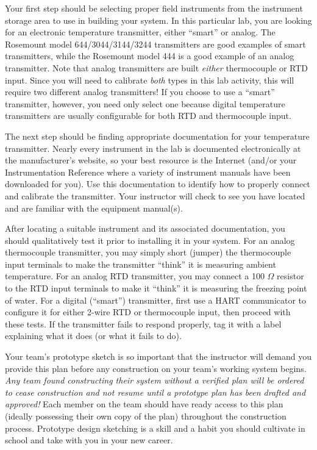 \documentclass[12pt,a4paper]{article}
\begin{document}
\begin{itemize}
\vskip 10pt

Your first step should be selecting proper field instruments from the instrument storage area to use in building your system.  In this particular lab, you are looking for an electronic temperature transmitter, either ``smart'' or analog.  The Rosemount model 644/3044/3144/3244 transmitters are good examples of smart transmitters, while the Rosemount model 444 is a good example of an analog transmitter.  Note that analog transmitters are built {\it either} thermocouple or RTD input.  Since you will need to calibrate {\it both} types in this lab activity, this will require two different analog transmitters!  If you choose to use a ``smart'' transmitter, however, you need only select one because digital temperature transmitters are usually configurable for both RTD and thermocouple input.

The next step should be finding appropriate documentation for your temperature transmitter.  Nearly every instrument in the lab is documented electronically at the manufacturer's website, so your best resource is the Internet (and/or your Instrumentation Reference where a variety of instrument manuals have been downloaded for you).  Use this documentation to identify how to properly connect and calibrate the transmitter.  Your instructor will check to see you have located and are familiar with the equipment manual(s).

After locating a suitable instrument and its associated documentation, you should qualitatively test it prior to installing it in your system.  For an analog thermocouple transmitter, you may simply short (jumper) the thermocouple input terminals to make the transmitter ``think'' it is measuring ambient temperature.  For an analog RTD transmitter, you may connect a 100 $\Omega$ resistor to the RTD input terminals to make it ``think'' it is measuring the freezing point of water.  For a digital (``smart'') transmitter, first use a HART communicator to configure it for either 2-wire RTD or thermocouple input, then proceed with these tests.  If the transmitter fails to respond properly, tag it with a label explaining what it does (or what it fails to do).

\vskip 10pt

Your team's prototype sketch is so important that the instructor will demand you provide this plan before any construction on your team's working system begins.  {\it Any team found constructing their system without a verified plan will be ordered to cease construction and not resume until a prototype plan has been drafted and approved!}  Each member on the team should have ready access to this plan (ideally possessing their own copy of the plan) throughout the construction process.  Prototype design sketching is a skill and a habit you should cultivate in school and take with you in your new career.


\end{itemize}
\end{document}
